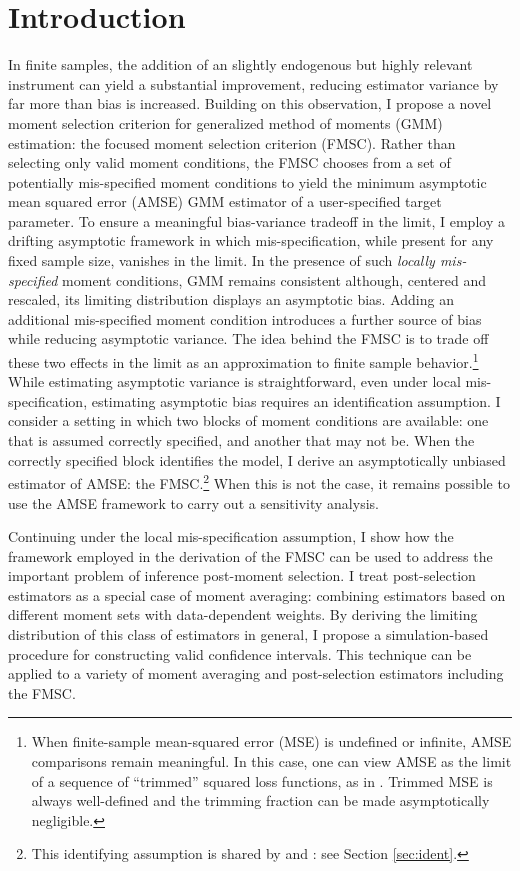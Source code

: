 \section{Introduction}
In finite samples, the addition of an slightly endogenous but highly relevant instrument can yield a substantial improvement, reducing estimator variance by far more than bias is increased. 
Building on this observation, I propose a novel moment selection criterion for generalized method of moments (GMM) estimation: the focused moment selection criterion (FMSC). 
Rather than selecting only valid moment conditions, the FMSC chooses from a set of potentially mis-specified moment conditions to yield the minimum asymptotic mean squared error (AMSE) GMM estimator of a user-specified target parameter.
To ensure a meaningful bias-variance tradeoff in the limit, I employ a drifting asymptotic framework in which mis-specification, while present for any fixed sample size, vanishes in the limit.
In the presence of such \emph{locally mis-specified} moment conditions, GMM remains consistent although, centered and rescaled, its limiting distribution displays an asymptotic bias. Adding an additional mis-specified moment condition introduces a further source of bias while reducing asymptotic variance. 
The idea behind the FMSC is to trade off these two effects in the limit as an approximation to finite sample behavior.\footnote{When finite-sample mean-squared error (MSE) is undefined or infinite, AMSE comparisons remain meaningful. In this case, one can view AMSE as the limit of a sequence of ``trimmed'' squared loss functions, as in \cite{Hansen2013}. Trimmed MSE is always well-defined and the trimming fraction can be made asymptotically negligible.} 
While estimating asymptotic variance is straightforward, even under local mis-specification, estimating asymptotic bias requires an identification assumption. 
I consider a setting in which two blocks of moment conditions are available: one that is assumed correctly specified, and another that may not be.
When the correctly specified block identifies the model, I derive an asymptotically unbiased estimator of AMSE: the FMSC.\footnote{This identifying assumption is shared by \cite{Liao} and \cite{ChengLiao}: see Section \ref{sec:ident}.}
When this is not the case, it remains possible to use the AMSE framework to carry out a sensitivity analysis. 

Continuing under the local mis-specification assumption, I show how the framework employed in the derivation of the FMSC can be used to address the important problem of inference post-moment selection.
I treat post-selection estimators as a special case of moment averaging: combining estimators based on different moment sets with data-dependent weights.
By deriving the limiting distribution of this class of estimators in general, I propose a simulation-based procedure for constructing valid confidence intervals. 
This technique can be applied to a variety of moment averaging and post-selection estimators including the FMSC. 

